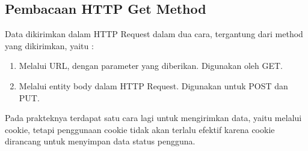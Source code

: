 \subsection{Pembacaan HTTP Get Method}
Data dikirimkan dalam HTTP Request dalam dua cara, tergantung dari method yang dikirimkan, yaitu :
\begin{enumerate}
  \item Melalui URL, dengan parameter yang diberikan. Digunakan oleh GET.
  \item Melalui entity body dalam HTTP Request. Digunakan untuk POST dan PUT.
\end{enumerate}

Pada prakteknya terdapat satu cara lagi untuk mengirimkan data, yaitu melalui cookie, tetapi penggunaan cookie tidak akan terlalu efektif karena cookie dirancang untuk menyimpan data status pengguna.

